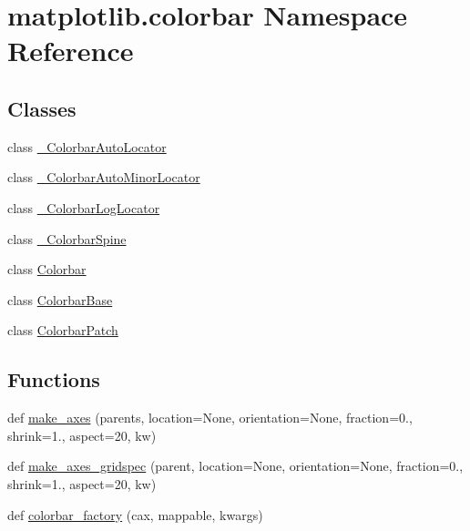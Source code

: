 \hypertarget{namespacematplotlib_1_1colorbar}{}\section{matplotlib.\+colorbar Namespace Reference}
\label{namespacematplotlib_1_1colorbar}
\subsection*{Classes}
\begin{DoxyCompactItemize}
\item 
class \hyperlink{classmatplotlib_1_1colorbar_1_1__ColorbarAutoLocator}{\+\_\+\+Colorbar\+Auto\+Locator}
\item 
class \hyperlink{classmatplotlib_1_1colorbar_1_1__ColorbarAutoMinorLocator}{\+\_\+\+Colorbar\+Auto\+Minor\+Locator}
\item 
class \hyperlink{classmatplotlib_1_1colorbar_1_1__ColorbarLogLocator}{\+\_\+\+Colorbar\+Log\+Locator}
\item 
class \hyperlink{classmatplotlib_1_1colorbar_1_1__ColorbarSpine}{\+\_\+\+Colorbar\+Spine}
\item 
class \hyperlink{classmatplotlib_1_1colorbar_1_1Colorbar}{Colorbar}
\item 
class \hyperlink{classmatplotlib_1_1colorbar_1_1ColorbarBase}{Colorbar\+Base}
\item 
class \hyperlink{classmatplotlib_1_1colorbar_1_1ColorbarPatch}{Colorbar\+Patch}
\end{DoxyCompactItemize}
\subsection*{Functions}
\begin{DoxyCompactItemize}
\item 
def \hyperlink{namespacematplotlib_1_1colorbar_a2ed7fcd101af15c1a2ee35b0582e606a}{make\+\_\+axes} (parents, location=None, orientation=None, fraction=0., shrink=1., aspect=20, kw)
\item 
def \hyperlink{namespacematplotlib_1_1colorbar_a1c8e23c91312e04776011a9af889799a}{make\+\_\+axes\+\_\+gridspec} (parent, location=None, orientation=None, fraction=0., shrink=1., aspect=20, kw)
\item 
def \hyperlink{namespacematplotlib_1_1colorbar_ab5ea96cb637e6ca5d7e2eecdc692a1e4}{colorbar\+\_\+factory} (cax, mappable, kwargs)
\end{DoxyCompactItemize}
